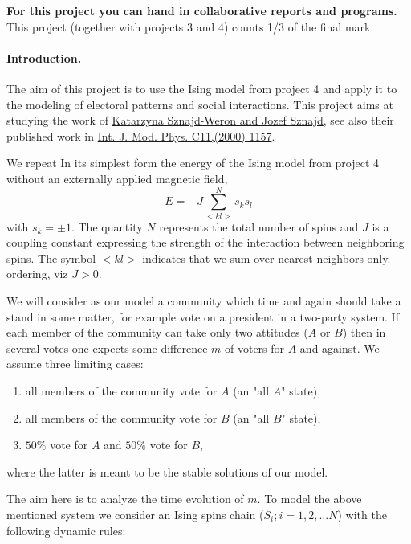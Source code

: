 \documentclass[%
oneside,                 %
final,                   %
10pt]{article}
\begin{document}
\textbf{For this project you can hand in collaborative reports and programs.}
This project (together with projects 3 and 4) counts 1/3 of the final mark.



\paragraph{Introduction.}
The aim of this project is to use the Ising model from project 4 and 
apply it to the modeling of electoral patterns and social interactions.
This project aims at studying the work of \href{{https://arxiv.org/abs/cond-mat/0101130}}{Katarzyna Sznajd-Weron and
Jozef Sznajd}, see also their
published work in \href{{https://www.worldscientific.com/doi/abs/10.1142/S0129183100000936}}{Int. J. Mod. Phys. C11,(2000) 1157}. 


We repeat 
In its simplest form
the energy of the Ising model from project 4 without an externally applied magnetic field, 
\[
E=-J\sum_{< kl >}^{N}s_ks_l 
\]
with
$s_k=\pm 1$. The quantity $N$ represents the total number of spins and $J$ is a coupling
constant expressing the strength of the interaction between
neighboring spins.  The symbol $<kl>$ indicates that we sum over
nearest neighbors only. 
ordering, viz $J> 0$.  

We will  consider as our model a community which time and again should
take a stand in some matter, for example vote on a president in
a two-party system. If each member of the
community can take only two attitudes ($A$ or $B$) then in several
votes one expects some difference $m$ of voters for $A$ and against.
We assume three limiting cases:

\begin{enumerate}
\item all members of the community vote for $A$ (an "all $A$" state),

\item all members of the community vote for $B$ (an "all $B$" state),

\item $50\%$ vote for $A$ and $50\%$ vote for $B$,
\end{enumerate}

\noindent
where the latter is meant to  be the stable solutions of our model.

The aim here is to analyze the time evolution of $m$. To model the
above mentioned system we consider an Ising spins chain
($S_i;i=1,2,\ldots N$) with the following dynamic rules:
\end{document}
